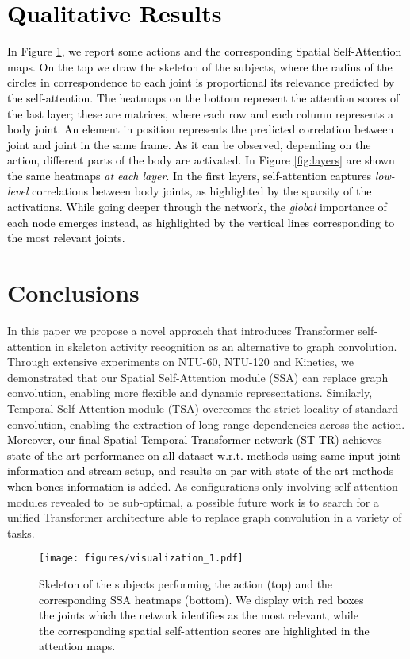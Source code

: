 \documentclass[times,twocolumn,final,authoryear]{elsarticle}
\DeclareRobustCommand{\new}[1]
{{\textcolor{black}{#1}}}
\begin{document}
\section{\new{Qualitative Results}}
\new{In Figure \ref{fig:heatmaps}, we report some actions and the corresponding Spatial Self-Attention maps. On the top we draw the skeleton of the subjects, where the radius of the circles in correspondence to each joint is proportional its relevance predicted by the self-attention. The heatmaps on the bottom represent the attention scores of the last layer; these are  matrices, where each row and each column represents a body joint. An element in position  represents the predicted correlation between joint  and joint  in the same frame. As it can be observed, depending on the action, different parts of the body are activated. In Figure \ref{fig:layers} are shown the same heatmaps \textit{at each layer}. In the first layers, self-attention captures \textit{low-level} correlations between body joints, as highlighted by the sparsity of the activations. While going deeper through the network, the \textit{global} importance of each node emerges instead, as highlighted by the vertical lines corresponding to the most relevant joints. 
}

\section{Conclusions}
In this paper we propose a novel approach that introduces Transformer self-attention in skeleton activity recognition as an alternative to graph convolution. Through extensive experiments on NTU-60, NTU-120 and Kinetics, we demonstrated that our Spatial Self-Attention module (SSA) can replace graph convolution, enabling more flexible and dynamic representations. Similarly, Temporal Self-Attention module (TSA) overcomes the strict locality of standard convolution, enabling the extraction of long-range dependencies across the action. \new{Moreover, our final Spatial-Temporal Transformer network (ST-TR)
achieves state-of-the-art performance on all dataset w.r.t. methods using same input joint information and stream setup, and results on-par with state-of-the-art methods when bones information is added.} As configurations only involving self-attention modules revealed to be sub-optimal, a possible future work is to search for a unified Transformer architecture able to replace graph convolution in a variety of tasks. 
 \begin{figure}[t]
    \centering
    \texttt{[image: figures/visualization\_1.pdf]}
    \caption{\new{Skeleton of the subjects performing the action (top) and the corresponding SSA heatmaps (bottom). We display with red boxes the joints which the network identifies as the most relevant, while the corresponding spatial self-attention scores are highlighted in the attention maps. } 
    }
    \label{fig:heatmaps}
\end{figure}
\end{document}
